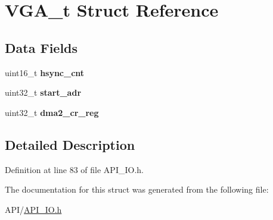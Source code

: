 \hypertarget{struct_v_g_a__t}{}\section{V\+G\+A\+\_\+t Struct Reference}
\label{struct_v_g_a__t}
\subsection*{Data Fields}
\begin{DoxyCompactItemize}
\item 
\mbox{\label{struct_v_g_a__t_a649bc185f93377aec7fa1c136dd2add0}} 
uint16\+\_\+t {\bfseries hsync\+\_\+cnt}
\item 
\mbox{\label{struct_v_g_a__t_a7f47a855ae47844b419d75797f00fbbb}} 
uint32\+\_\+t {\bfseries start\+\_\+adr}
\item 
\mbox{\label{struct_v_g_a__t_a1fc3c1405cc22f5d4fc21eb58c47c06a}} 
uint32\+\_\+t {\bfseries dma2\+\_\+cr\+\_\+reg}
\end{DoxyCompactItemize}


\subsection{Detailed Description}


Definition at line 83 of file A\+P\+I\+\_\+\+I\+O.\+h.



The documentation for this struct was generated from the following file\+:\begin{DoxyCompactItemize}
\item 
A\+P\+I/\hyperlink{_a_p_i___i_o_8h}{A\+P\+I\+\_\+\+I\+O.\+h}\end{DoxyCompactItemize}
